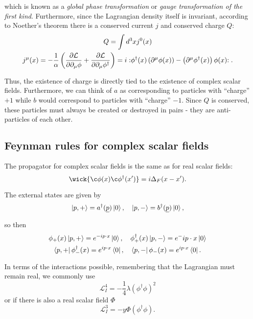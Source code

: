 \documentclass{article}
\newcommand{\normord}[1]{:\mathrel{#1}:}
\begin{document}
which is known as a \textit{global phase transformation} or \textit{gauge transformation of the first kind}. Furthermore, since the Lagrangian density itself is invariant, according to Noether's theorem there is a conserved current $j$ and conserved charge $Q$:
\begin{gather}
    Q = \int d^3x j^0(x) \\
    j^\mu(x) = -\frac{1}{\alpha}\left(\pdv{\mathcal{L}}{\partial_\mu\phi} + \pdv{\mathcal{L}}{\partial_\mu\phi^\dagger}\right) = i \normord{\phi^\dagger(x)\left(\partial^\mu \phi(x)\right) - \left(\partial^\mu \phi^\dagger(x)\right)\phi(x)}.
\end{gather}

Thus, the existence of charge is directly tied to the existence of complex scalar fields. Furthermore, we can think of $a$ as corresponding to particles with ``charge'' $+1$ while $b$ would correspond to particles with ``charge'' $-1$. Since $Q$ is conserved, these particles must always be created or destroyed in pairs - they are anti-particles of each other.

\subsection{Feynman rules for complex scalar fields}

The propagator for complex scalar fields is the same as for real scalar fields:
\begin{equation}
    \wick{\c\phi(x)\c\phi^\dagger(x')} = i\Delta_F(x-x').
\end{equation}

The external states are given by 
\begin{equation}
    \ket{p,+} = a^\dagger(\underline{p})\ket{0}, \quad \ket{p,-}=b^\dagger(\underline{p})\ket{0},
\end{equation}

so then
\begin{gather}
    \phi_+(x)\ket{p,+} = e^{-ip\cdot x}\ket{0}, \quad \phi_+^\dagger(x)\ket{p,-} = e^-ip\cdot x \ket{0} \\
    \bra{p,+}\phi_-^\dagger(x)=e^{ip\cdot x} \bra{0}, \quad \bra{p,-} \phi_-(x) = e^{ip\cdot x} \bra{0}.
\end{gather}

In terms of the interactions possible, remembering that the Lagrangian must remain real, we commonly use
\begin{equation}
    \mathcal{L}_I^4 = -\frac{1}{4}\lambda (\phi^\dagger\phi)^2
\end{equation}
or if there is also a real scalar field $\Phi$ 
\begin{equation}
    \mathcal{L}_I^3 = -y\Phi(\phi^\dagger\phi).
\end{equation}
\end{document}
